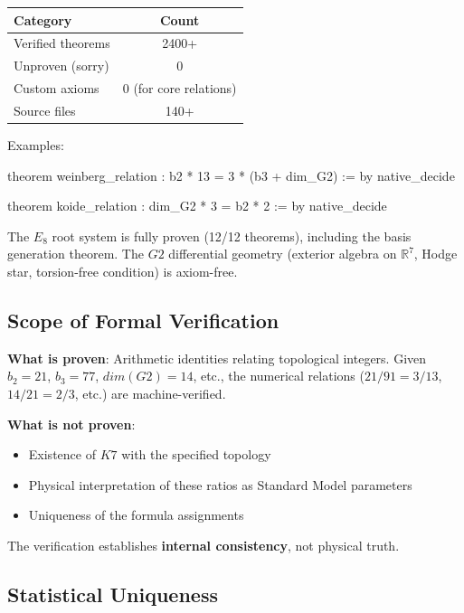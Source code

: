 \documentclass[11pt,a4paper]{article}
\newcommand{\E}{\mathrm{E}}
\newcommand{\Gtwo}{\mathrm{G}_2}
\newcommand{\Kseven}{K_7}
\newcommand{\dimE}{\mathrm{dim}}
\def\Gtwo{G2}%
\def\Kseven{K7}%
\def\E{E}%
\def\dimE{dim}%
\begin{document}
\begin{table}[H]
\centering
\begin{tabular}{lc}
\toprule
Category & Count \\
\midrule
Verified theorems & 2400+ \\
Unproven (sorry) & 0 \\
Custom axioms & 0 (for core relations) \\
Source files & 140+ \\
\bottomrule
\end{tabular}
\end{table}

Examples:

\begin{nopagebreakcode}
theorem weinberg_relation :
  b2 * 13 = 3 * (b3 + dim_G2) := by native_decide

theorem koide_relation :
  dim_G2 * 3 = b2 * 2 := by native_decide
\end{nopagebreakcode}

The $\E_8$ root system is fully proven (12/12 theorems), including the basis generation theorem. The $\Gtwo$ differential geometry (exterior algebra on $\mathbb{R}^7$, Hodge star, torsion-free condition) is axiom-free.

\subsection{Scope of Formal Verification}

\textbf{What is proven}: Arithmetic identities relating topological integers. Given $b_2 = 21$, $b_3 = 77$, $\dimE(\Gtwo) = 14$, etc., the numerical relations ($21/91 = 3/13$, $14/21 = 2/3$, etc.) are machine-verified.

\textbf{What is not proven}:
\begin{itemize}
\item Existence of $\Kseven$ with the specified topology
\item Physical interpretation of these ratios as Standard Model parameters
\item Uniqueness of the formula assignments
\end{itemize}

The verification establishes \textbf{internal consistency}, not physical truth.

\subsection{Statistical Uniqueness}
\end{document}
